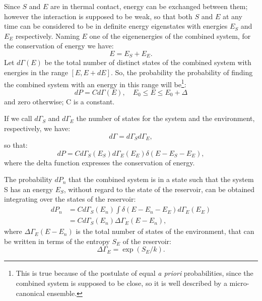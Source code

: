Since $S$ and $E$ are in thermal contact, energy can be exchanged between them; however the interaction is supposed to be weak, so that both $S$ and $E$ at any time can be considered to be in definite energy eigenstates with energies $E_S$ and $E_E$ respectively. Naming $E$ one of the eigenenergies of the combined system, for the conservation of energy we have:
\begin{equation*}
    E = E_S + E_E.
\end{equation*}
Let $d\Gamma(E)$ be the total number of distinct states of the combined system with energies in the range $[E, E+dE]$. So, the probability the probability of finding the combined system with an energy in this range will be\footnote{This is true because of the postulate of equal \emph{a priori} probabilities, since the combined system is supposed to be close, so it is well described by a micro-canonical ensemble.}:
\begin{equation}
    dP = C d\Gamma(E), \quad E_0 \leq E \leq E_0 + \Delta
\end{equation}
and zero otherwise; C is a constant.

If we call $d\Gamma_S$ and $d\Gamma_E$ the number of states for the system and the environment, respectively, we have:
\begin{equation}
        d\Gamma = d\Gamma_S d\Gamma_E, 
\end{equation}
so that:
\begin{equation}
    dP = C d\Gamma_S(E_S) d\Gamma_E(E_E) \delta(E-E_S-E_E),
\end{equation}
where the delta function expresses the conservation of energy.

The probability $dP_n$ that the combined system is in a state such that the system S has an energy $E_S$, without regard to the state of the reservoir, can be obtained integrating over the states of the reservoir:
\begin{equation}
\begin{split}
\label{eqn:prob_energy_system}
    dP_n &= Cd\Gamma_S(E_n) \int \delta(E-E_n-E_E) d\Gamma_E(E_E) \\
         &= Cd\Gamma_S(E_n) \Delta\Gamma_E(E-E_n),
\end{split}
\end{equation}
where $\Delta\Gamma_E(E-E_n)$ is the total number of states of the environment, that can be written in terms of the entropy $S_E$ of the reservoir:
\begin{equation*}
    \Delta\Gamma_E = \exp{(S_E/k)}.
\end{equation*}

